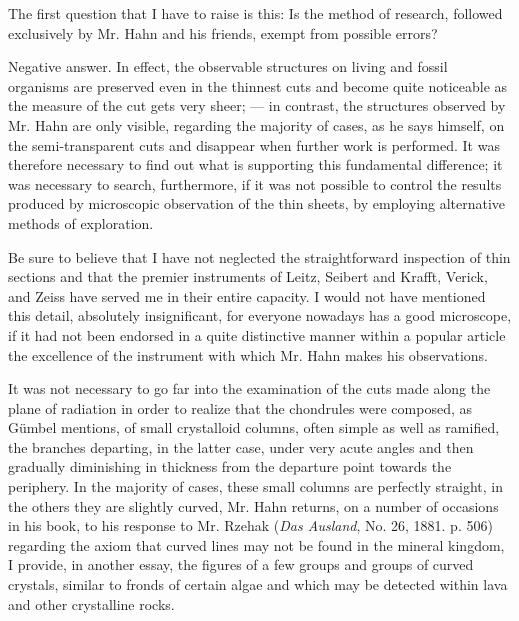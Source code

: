 \documentclass[a4paper, 12pt, oneside]{article}
\begin{document}
The first question that I have to raise is this: Is the method of research, followed exclusively by Mr. Hahn and his friends, exempt from possible errors?

Negative answer. In effect, the observable structures on living and fossil organisms are preserved even in the thinnest cuts and become quite noticeable as the measure of the cut gets very sheer; --- in contrast, the structures observed by Mr. Hahn are only visible, regarding the majority of cases, as he says himself, on the semi-transparent cuts and disappear when further work is performed. It was therefore necessary to find out what is supporting this fundamental difference; it was necessary to search, furthermore, if it was not possible to control the results produced by microscopic observation of the thin sheets, by employing alternative methods of exploration.

Be sure to believe that I have not neglected the straightforward inspection of thin sections and that the premier instruments of Leitz, Seibert and Krafft, Verick, and Zeiss have served me in their entire capacity. I would not have mentioned this detail, absolutely insignificant, for everyone nowadays has a good microscope, if it had not been endorsed in a quite distinctive manner within a popular article the excellence of the instrument with which Mr. Hahn makes his observations.

It was not necessary to go far into the examination of the cuts made along the plane of radiation in order to realize that the chondrules were composed, as Gümbel mentions, of small crystalloid columns, often simple as well as ramified, the branches departing, in the latter case, under very acute angles and then gradually diminishing in thickness from the departure point towards the periphery. In the majority of cases, these small columns are perfectly straight, in the others they are slightly curved, Mr. Hahn returns, on a number of occasions in his book, to his response to Mr. Rzehak (\emph{Das Ausland}, No. 26, 1881. p. 506) regarding the axiom that curved lines may not be found in the mineral kingdom, I provide, in another essay, the figures of a few groups and groups of curved crystals, similar to fronds of certain algae and which may be detected within lava and other crystalline rocks.
\end{document}
